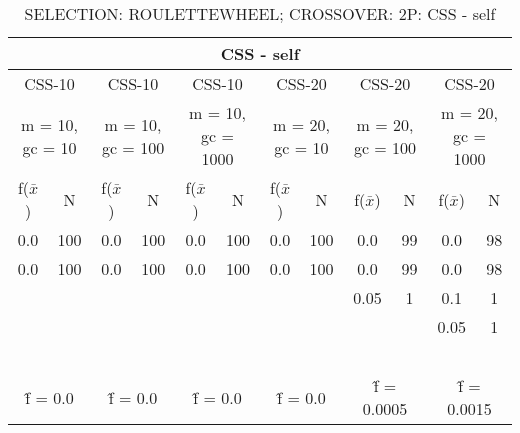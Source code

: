\begin{table}[H]
	\centering
	\caption{SELECTION: ROULETTEWHEEL; CROSSOVER: 2P: CSS - self}
	\begin{adjustbox}{width=1\textwidth}
		\begin{tabular}{ |c|c||c|c||c|c||c|c||c|c||c|c| }
			\hline
			\multicolumn{12}{|c|}{CSS - self} \\
			\hline
			\multicolumn{2}{|c||}{CSS-10} & \multicolumn{2}{c||}{CSS-10} & \multicolumn{2}{c||}{CSS-10} & \multicolumn{2}{c||}{CSS-20} & \multicolumn{2}{c||}{CSS-20} & \multicolumn{2}{c|}{CSS-20}\\
			\hline
			\multicolumn{2}{|c||}{m = 10, gc = 10} & \multicolumn{2}{c||}{m = 10, gc = 100} & \multicolumn{2}{c||}{m = 10, gc = 1000} & \multicolumn{2}{c||}{m = 20, gc = 10} & \multicolumn{2}{c||}{m = 20, gc = 100} & \multicolumn{2}{c|}{m = 20, gc = 1000}\\
			\hline
			f($\bar{x}$) & N & f($\bar{x}$) & N & f($\bar{x}$) & N & f($\bar{x}$) & N & f($\bar{x}$) & N & f($\bar{x}$) & N\\
			\hline
			\hline
			0.0 & 100 & 0.0 & 100 & 0.0 & 100 & 0.0 & 100 & 0.0 & 99 & 0.0 & 98\\
			\hline
			0.0 & 100 & 0.0 & 100 & 0.0 & 100 & 0.0 & 100 & 0.0 & 99 & 0.0 & 98\\
			&   &   &   &   &   &   &   & 0.05 & 1 & 0.1 & 1\\
			&   &   &   &   &   &   &   &   &   & 0.05 & 1\\
			&   &   &   &   &   &   &   &   &   &   &  \\
			&   &   &   &   &   &   &   &   &   &   &  \\
			&   &   &   &   &   &   &   &   &   &   &  \\
			&   &   &   &   &   &   &   &   &   &   &  \\
			&   &   &   &   &   &   &   &   &   &   &  \\
			\hline
			\multicolumn{2}{|c||}{\^{f} = 0.0} & \multicolumn{2}{c||}{\^{f} = 0.0} & \multicolumn{2}{c||}{\^{f} = 0.0} & \multicolumn{2}{c||}{\^{f} = 0.0} & \multicolumn{2}{c||}{\^{f} = 0.0005} & \multicolumn{2}{c|}{\^{f} = 0.0015}\\
			\hline
		\end{tabular}
	\end{adjustbox}
\end{table}
